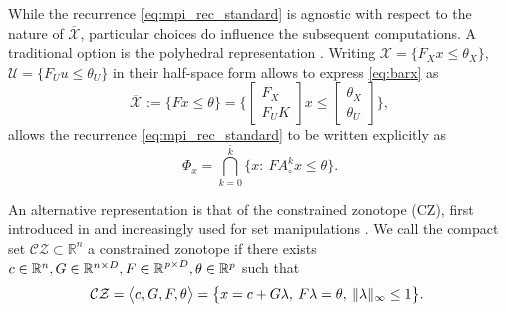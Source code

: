 \documentclass[journal,twoside,web]{ieeecolor}
\newcommand{\be}{\begin{equation}}
\newcommand{\ee}{\end{equation}}
\newcommand{\re}[1]{\mathbb{R}^{#1}}%
\newcommand{\bbm}{\begin{bmatrix}}
\newcommand{\ebm}{\end{bmatrix}}
\newtheorem{rem}{Remark}
\newcommand{\eor}{\ensuremath{\hfill\blacklozenge}}
\newcommand{\bbm}{\begin{bmatrix}}
\newcommand{\ebm}{\end{bmatrix}}
\newtheorem{rem}{Remark}
\newcommand{\eor}{\hfill\ensuremath{\blacklozenge}}
\begin{document}
While the recurrence \eqref{eq:mpi_rec_standard} is agnostic with respect to the nature of $\overline{\mathcal X}$, particular choices do influence the subsequent computations. A traditional option is the polyhedral representation \cite{ziegler2012lectures}. Writing $\mathcal X=\{F_Xx\leq \theta_X\}$, $ \mathcal U=\{F_Uu\leq \theta_U\}$ in their half-space form allows to express \eqref{eq:barx} as
\begin{equation}
\label{eq:hrep}
\overline{\mathcal X}:=\{F x \leq \theta\}=\biggl\{\bbm F_X\\ F_UK\ebm x\leq \bbm \theta_X\\\theta_U\ebm\biggr\},
\end{equation}
allows the recurrence \eqref{eq:mpi_rec_standard} to be written explicitly as
\begin{equation}
\label{eq:mpi-recurrence-polyhedral}
    \Phi_x=\bigcap\limits_{k=0}^{\bar k} \bigl\{x:\: FA_\circ^kx \leq \theta \bigr\}.
\end{equation}

An alternative representation is that of the constrained zonotope (CZ), first introduced in \cite{scott2016constrained} and increasingly used for set manipulations \cite{raghuraman2022set}. We call the compact set $\mathcal{CZ} \subset \re{n}$ a constrained zonotope if there exists $c \in \mathbb R^{n}, G \in \mathbb R^{n \times D}, F \in \mathbb \re^{p\times D}, \theta \in \mathbb R^{p}$ such that
\begin{equation}
\label{eq:con_poly_zono}
    \mkern-8mu\mathcal{CZ} = \bigl\langle c, G, F, \theta\bigr\rangle = \big \{x = c + G\lambda,\: F\lambda=\theta,\: \|\lambda\|_\infty \leq 1\bigr\}.
\end{equation}






\end{document}
